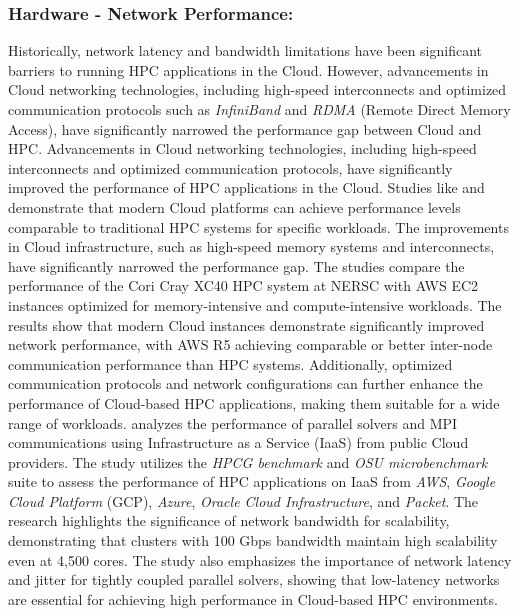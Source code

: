
    \subsubsection{Hardware - Network Performance:} Historically, network latency and bandwidth limitations have been significant barriers to running HPC applications in the Cloud. However, advancements in Cloud networking technologies, including high-speed interconnects and optimized communication protocols such as \textit{InfiniBand} and \textit{RDMA} (Remote Direct Memory Access), have significantly narrowed the performance gap between Cloud and HPC. Advancements in Cloud networking technologies, including high-speed interconnects and optimized communication protocols, have significantly improved the performance of HPC applications in the Cloud. Studies like \cite{guidi_10_2021} and \cite{fernandez_evaluation_2022} demonstrate that modern Cloud platforms can achieve performance levels comparable to traditional HPC systems for specific workloads. The improvements in Cloud infrastructure, such as high-speed memory systems and interconnects, have significantly narrowed the performance gap. The studies compare the performance of the Cori Cray XC40 HPC system at NERSC with AWS EC2 instances optimized for memory-intensive and compute-intensive workloads. The results show that modern Cloud instances demonstrate significantly improved network performance, with AWS R5 achieving comparable or better inter-node communication performance than HPC systems. Additionally, optimized communication protocols and network configurations can further enhance the performance of Cloud-based HPC applications, making them suitable for a wide range of workloads. \cite{fernandez_evaluation_2022} analyzes the performance of parallel solvers and MPI communications using Infrastructure as a Service (IaaS) from public Cloud providers. The study utilizes the \textit{HPCG benchmark} and \textit{OSU microbenchmark} suite to assess the performance of HPC applications on IaaS from \textit{AWS}, \textit{Google Cloud Platform} (GCP), \textit{Azure}, \textit{Oracle Cloud Infrastructure}, and \textit{Packet}. The research highlights the significance of network bandwidth for scalability, demonstrating that clusters with 100 Gbps bandwidth maintain high scalability even at 4,500 cores. The study also emphasizes the importance of network latency and jitter for tightly coupled parallel solvers, showing that low-latency networks are essential for achieving high performance in Cloud-based HPC environments.


